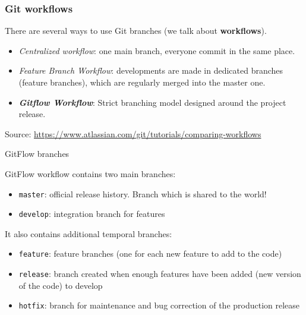 \documentclass[svgnames]{beamer}
\begin{document}
\begin{frame}
    \frametitle{Git workflows} %
    There are several ways to use Git branches (we talk about \textbf{workflows}). 

    \begin{itemize}
        \item \emph{Centralized workflow}: one main branch, everyone commit in the same place.
        \item \emph{Feature Branch Workflow}: developments are made in dedicated branches (feature branches), which are regularly merged into the master one.
        \item \textbf{\textit{Gitflow Workflow}}: Strict branching model designed around the project release.
    \end{itemize}

    \tiny Source: \url{https://www.atlassian.com/git/tutorials/comparing-workflows}

\end{frame}

\begin{frame}[fragile]{GitFlow branches}

    GitFlow workflow contains two main branches:
    \begin{itemize}
        \item{\verb+master+: official release history. Branch which is shared to the world!}
        \item{\verb+develop+: integration branch for features}
    \end{itemize}

    It also contains additional temporal branches:
    \begin{itemize}
        \item{\verb+feature+: feature branches (one for each new feature to add to the code)}
        \item{\verb+release+: branch created when enough features have been added (new version of the code) to develop}
        \item{\verb+hotfix+: branch for maintenance and bug correction of the production release}
    \end{itemize}

\end{frame}
\end{document}
